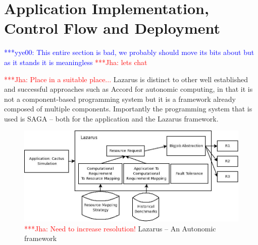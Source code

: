 \documentclass[conference,final]{IEEEtran}
\newcommand{\jhanote}[1]{ {\textcolor{red} { ***Jha: #1 }}}
\newcommand{\yyenote}[1]{ {\textcolor{blue} { ***yye00: #1 }}}
\newcommand{\jhanote}[1]{}
\newcommand{\yyenote}[1]{}
\begin{document}



\section{Application Implementation, Control Flow and Deployment}

\yyenote{This entire section is bad, we probably should move its bits
  about but as it stands it is meaningless} \jhanote{lets chat}

\jhanote{Place in a suitable place...}  Lazarus is distinct to other
well established and successful approaches such as Accord for
autonomic computing, in that it is not a component-based programming
system but it is a framework already composed of multiple
components. Importantly the programming system that is used is SAGA --
both for the application and the Lazarus framework.

\begin{figure}
\begin{center}
\includegraphics[scale=0.3]{./figures/Lazarus_01.jpeg}
\end{center}
\caption{\jhanote{Need to increase resolution!}  Lazarus -- An
  Autonomic framework}

\label{fig:application_architecture}
\end{figure}
\end{document}
